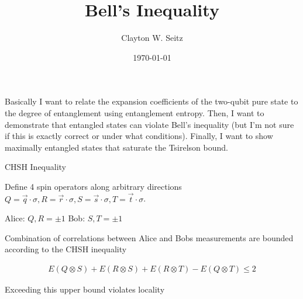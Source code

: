 \documentclass[aspectratio=1610]{beamer}					%
\title{Bell's Inequality}	%
\author{Clayton W. Seitz}								%
\date{\today}									%
\begin{document}
\begin{frame}
  \titlepage
\end{frame}

\begin{frame}{}

Basically I want to relate the expansion coefficients of the two-qubit pure state to the degree of entanglement using entanglement entropy. Then, I want to demonstrate that entangled states can violate Bell's inequality (but I'm not sure if this is exactly correct or under what conditions). Finally, I want to show maximally entangled states that saturate the Tsirelson bound.

\end{frame}

\begin{frame}{CHSH Inequality}

Define 4 spin operators along arbitrary directions $Q = \vec{q}\cdot\sigma, R = \vec{r}\cdot\sigma, S = \vec{s}\cdot\sigma, T = \vec{t}\cdot\sigma$.

\vspace{0.2in}

Alice: $Q,R = \pm 1$
Bob: $S, T = \pm 1$

\vspace{0.1in}
Combination of correlations between Alice and Bobs measurements are bounded according to the CHSH inequality

\begin{align*}
E(Q\otimes S) + E(R\otimes S) + E(R\otimes T) - E(Q\otimes T) \leq 2
\end{align*}

Exceeding this upper bound violates locality

\end{frame}
\end{document}
